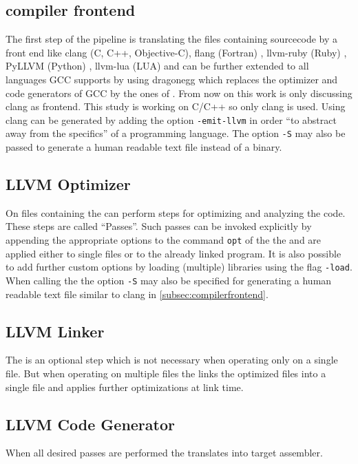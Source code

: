 \subsection{compiler frontend}\label{subsec:compilerfrontend}
The first step of the pipeline is translating the files containing sourcecode by a front end like clang (C, C++, Objective-C), flang (Fortran) \cite{fortranllvm}, llvm-ruby (Ruby) \cite{rubyllvm}, PyLLVM (Python) \cite{pyllvm}, llvm-lua (LUA) \cite{luallvm} and can be further extended to all languages GCC supports by using dragonegg \cite{dragonegg} which replaces the optimizer and code generators of GCC by the ones of \llvm.
From now on this work is only discussing clang as frontend.
This study is working on C/C++ so only clang is used.
Using clang \llvmir can be generated by adding the option \texttt{-emit-llvm} in order \enquote{to abstract away from the specifics} \cite{FastScopDetection} of a programming language.
The option \texttt{-S} may also be passed to generate a human readable text file instead of a \llvmir binary.
\subsection{LLVM Optimizer}\label{subsec:optimizer}
On files containing \llvmir the \opt can perform steps for optimizing and analyzing the code.
These steps are called \enquote{Passes}.
Such passes can be invoked explicitly by appending the appropriate options to the command \texttt{opt} of the the \opt and are applied either to single files or to the already linked program.
It is also possible to add further custom options by loading (multiple) libraries using the flag \texttt{-load}.
When calling the \opt the option \texttt{-S} may also be specified for generating a human readable text file similar to clang in \autoref{subsec:compilerfrontend}.
\subsection{LLVM Linker}
The \linker is an optional step which is not necessary when operating only on a single \llvmir file.
But when operating on multiple files the \linker links the optimized \llvmir files into a single \llvmir file and applies further optimizations at link time.
\subsection{LLVM Code Generator}
When all desired passes are performed the \generator translates \llvmir into target assembler.
